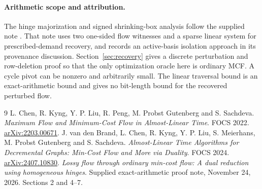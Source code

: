 \documentclass[11pt,letterpaper]{article}
\begin{document}
\paragraph{Arithmetic scope and attribution.}
The hinge majorization and signed shrinking-box analysis follow the
supplied note \cite{hinge-note}. That note uses two one-sided flow witnesses
and a sparse linear system for prescribed-demand recovery, and records an
active-basis isolation approach in its provenance discussion.
Section~\ref{sec:recovery} gives a discrete perturbation and
row-deletion proof so that the only optimization oracle here is ordinary
MCF. A cycle pivot can be nonzero and arbitrarily small. The linear
traversal bound is an exact-arithmetic bound and gives no bit-length
bound for the recovered perturbed flow.

\begin{thebibliography}{9}
L. Chen, R. Kyng, Y. P. Liu, R. Peng, M. Probst Gutenberg and S. Sachdeva.
\emph{Maximum Flow and Minimum-Cost Flow in Almost-Linear Time}.
FOCS 2022. \href{https://arxiv.org/abs/2203.00671}{arXiv:2203.00671}.
J. van den Brand, L. Chen, R. Kyng, Y. P. Liu, S. Meierhans,
M. Probst Gutenberg and S. Sachdeva.
\emph{Almost-Linear Time Algorithms for Decremental Graphs:
Min-Cost Flow and More via Duality}. FOCS 2024.
\href{https://arxiv.org/abs/2407.10830}{arXiv:2407.10830}.
\emph{Lossy flow through ordinary min-cost flow: A dual reduction using
homogeneous hinges}. Supplied exact-arithmetic proof note, November 24,
2026. Sections 2 and 4--7.
\end{thebibliography}
\end{document}
